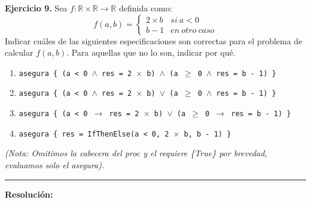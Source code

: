 \hypertarget{ej9}{}
\noindent \textbf{Ejercicio 9.} Sea $f:\mathbb{R}\times\mathbb{R}\rightarrow\mathbb{R}$ definida como:
\[ f(a,b) = \begin{cases} 
      2 \times b & si~a < 0 \\
      b - 1 & en~otro~caso 
   \end{cases} \]
Indicar cuáles de las siguientes especificaciones son correctas para el problema de calcular $f(a,b)$. Para aquellas que no lo son, indicar por qué.

\begin{enumerate}[label=\alph*)]
    \item \texttt{asegura \{ (a < 0 $\wedge$ res = 2 $\times$ b) $\wedge$ (a $\geq$ 0 $\wedge$ res = b - 1) \}}
    \item \texttt{asegura \{ (a < 0 $\wedge$ res = 2 $\times$ b) $\vee$ (a $\geq$ 0 $\wedge$ res = b - 1) \}}
    \item \texttt{asegura \{ (a < 0 $\rightarrow$ res = 2 $\times$ b) $\vee$ (a $\geq$ 0 $\rightarrow$ res = b - 1) \}}
    \item \texttt{asegura \{ res = IfThenElse(a < 0, 2 $\times$ b, b - 1) \}}
\end{enumerate}
\textit{(Nota: Omitimos la cabecera del proc y el requiere \{True\} por brevedad, evaluamos solo el asegura).}

\vspace{0.2cm}
{\color{gray}\hrule}
\vspace{0.4cm}

\textbf{Resolución:}

